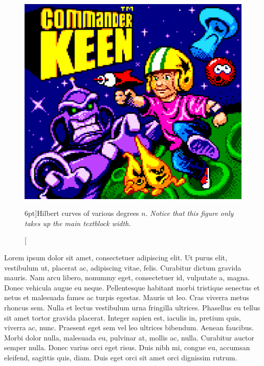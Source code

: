 \documentclass[
  english,
  symmetric,justified,marginals=raggedouter]{tufte-book}
\begin{document}
\begin{figure}[h!]
  \includegraphics{keen.png}
  \caption[Hilbert curves of various degrees $n$.][6pt]{Hilbert curves of various degrees $n$. \emph{Notice that this figure only takes up the main textblock width.}}
  \label{fig:textfig}
\end{figure}

\begin{fullwidth}
Lorem ipsum dolor sit amet, consectetuer adipiscing elit. Ut purus elit, vestibulum ut, placerat ac, adipiscing vitae, felis. Curabitur
dictum gravida mauris. Nam arcu libero, nonummy eget, consectetuer id, vulputate a, magna. Donec vehicula augue eu neque.
Pellentesque habitant morbi tristique senectus et netus et malesuada fames ac turpis egestas. Mauris ut leo. Cras viverra metus
rhoncus sem. Nulla et lectus vestibulum urna fringilla ultrices. Phasellus eu tellus sit amet tortor gravida placerat. Integer sapien
est, iaculis in, pretium quis, viverra ac, nunc. Praesent eget sem vel leo ultrices bibendum. Aenean faucibus. Morbi dolor nulla,
malesuada eu, pulvinar at, mollis ac, nulla. Curabitur auctor semper nulla. Donec varius orci eget risus. Duis nibh mi, congue eu,
accumsan eleifend, sagittis quis, diam. Duis eget orci sit amet orci dignissim rutrum.
\end{fullwidth}

\backmatter

\small

  


\normalsize


\cleardoublepage

%

\listoffigures 
\listoftables
\end{document}
